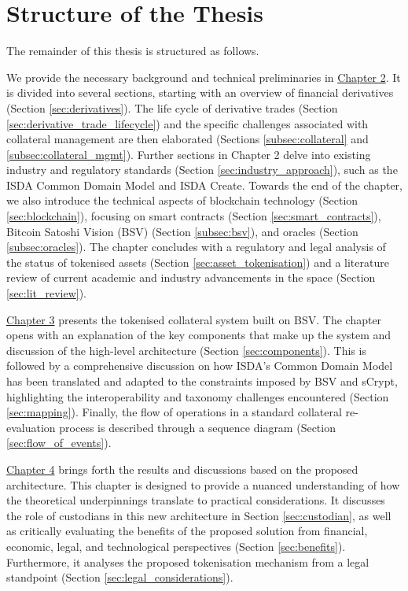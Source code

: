 \section{Structure of the Thesis}
\label{sec:structure}

The remainder of this thesis is structured as follows.

We provide the necessary background and technical preliminaries in \hyperref[ch:Background]{Chapter 2}. It is divided into several sections, starting with an overview of financial derivatives (Section \ref{sec:derivatives}). The life cycle of derivative trades (Section \ref{sec:derivative_trade_lifecycle}) and the specific challenges associated with collateral management are then elaborated (Sections \ref{subsec:collateral} and \ref{subsec:collateral_mgmt}). Further sections in Chapter 2 delve into existing industry and regulatory standards (Section \ref{sec:industry_approach}), such as the ISDA Common Domain Model and ISDA Create. Towards the end of the chapter, we also introduce the technical aspects of blockchain technology (Section \ref{sec:blockchain}), focusing on smart contracts (Section \ref{sec:smart_contracts}), Bitcoin Satoshi Vision (BSV) (Section \ref{subsec:bsv}), and oracles (Section \ref{subsec:oracles}). The chapter concludes with a regulatory and legal analysis of the status of tokenised assets (Section \ref{sec:asset_tokenisation}) and a literature review of current academic and industry advancements in the space (Section \ref{sec:lit_review}). 

\hyperref[ch:solutionArchitecture]{Chapter 3} presents the tokenised collateral system built on BSV. The chapter opens with an explanation of the key components that make up the system and discussion of the high-level architecture (Section \ref{sec:components}). This is followed by a comprehensive discussion on how ISDA's Common Domain Model has been translated and adapted to the constraints imposed by BSV and sCrypt, highlighting the interoperability and taxonomy challenges encountered (Section \ref{sec:mapping}). Finally, the flow of operations in a standard collateral re-evaluation process is described through a sequence diagram (Section \ref{sec:flow_of_events}).

\hyperref[ch:resultsDiscussion]{Chapter 4} brings forth the results and discussions based on the proposed architecture. This chapter is designed to provide a nuanced understanding of how the theoretical underpinnings translate to practical considerations. It discusses the role of custodians in this new architecture in Section \ref{sec:custodian}, as well as critically evaluating the benefits of the proposed solution from financial, economic, legal, and technological perspectives (Section \ref{sec:benefits}). Furthermore, it analyses the proposed tokenisation mechanism from a legal standpoint (Section \ref{sec:legal_considerations}). 

